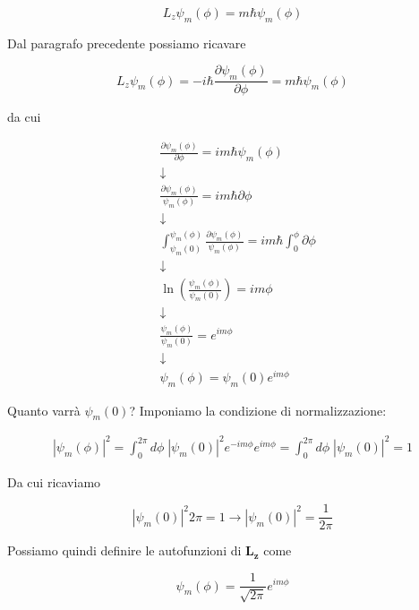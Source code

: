 \begin{equation}
L_z\psi_m(\phi)= m \hbar \psi_m(\phi)
\end{equation}
 
 Dal paragrafo precedente possiamo ricavare
 
 \begin{equation}
 L_z\psi_m(\phi)= -i \hbar \frac{\partial \psi_m (\phi)}{\partial \phi} = m \hbar \psi_m(\phi)
 \end{equation}
 
 da cui
 
 \begin{align}
{}& \frac{\partial \psi_m (\phi)}{\partial \phi} = i m \hbar \psi_m(\phi) \nonumber \\
&\downarrow \nonumber \\
&  \frac{\partial \psi_m (\phi)}{\psi_m(\phi)} = i m \hbar \partial \phi \nonumber \\
&\downarrow \nonumber \\
&\int_{\psi_m(0)}^{\psi_m(\phi)} \frac{\partial \psi_m (\phi)}{\psi_m(\phi)} = i m \hbar \int_{0}^{\phi} \partial \phi \nonumber \\
&\downarrow \nonumber \\
&\ln(\frac{\psi_m(\phi)}{\psi_m(0)}) = i m \phi \nonumber \\
&\downarrow \nonumber \\
&\frac{\psi_m(\phi)}{\psi_m(0)}= e^{i m \phi} \nonumber \\
&\downarrow \nonumber \\
&\psi_m(\phi)= \psi_m(0) e^{i m \phi}
\end{align}

Quanto varrà $\psi_m(0)$? Imponiamo la condizione di normalizzazione:

\begin{align}
|\psi_m(\phi)|^2= \int_{0}^{2\pi} d\phi \;|\psi_m(0)|^2 e^{-i m \phi}e^{i m \phi} = \int_{0}^{2\pi} d\phi \;|\psi_m(0)|^2 = 1
\end{align}

Da cui ricaviamo

\begin{equation}
|\psi_m(0)|^2 2\pi = 1 \rightarrow |\psi_m(0)|^2 = \frac{1}{2\pi}
\end{equation}

Possiamo quindi definire le autofunzioni di $\mathbf{L_z}$ come

\begin{equation}
\psi_m(\phi)= \frac{1}{\sqrt{2\pi}} e^{i m \phi}
\end{equation}

